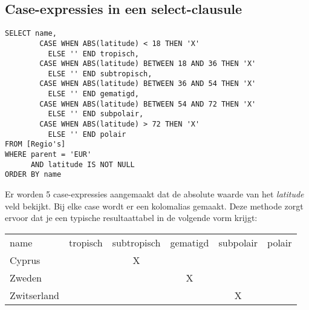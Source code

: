 \documentclass[12pt]{report}
\begin{document}
\subsection{Case-expressies in een select-clausule}

\begin{verbatim}
SELECT name,
        CASE WHEN ABS(latitude) < 18 THEN 'X' 
          ELSE '' END tropisch,
        CASE WHEN ABS(latitude) BETWEEN 18 AND 36 THEN 'X'
          ELSE '' END subtropisch,
        CASE WHEN ABS(latitude) BETWEEN 36 AND 54 THEN 'X'
          ELSE '' END gematigd,
        CASE WHEN ABS(latitude) BETWEEN 54 AND 72 THEN 'X'
          ELSE '' END subpolair,
        CASE WHEN ABS(latitude) > 72 THEN 'X'
          ELSE '' END polair
FROM [Regio's]
WHERE parent = 'EUR'
      AND latitude IS NOT NULL
ORDER BY name 
\end{verbatim}
Er worden 5 case-expressies aangemaakt dat de absolute waarde van het \textit{latitude} veld bekijkt. Bij elke case wordt er een 
kolomalias gemaakt. Deze methode zorgt ervoor dat je een typische resultaattabel in de volgende vorm krijgt:
\newline
\begin{tabular}{l c c c c c}
 name & tropisch & subtropisch & gematigd & subpolair & polair \\
 Cyprus & & X & & & \\
 Zweden & & & X & & \\
 Zwitserland & & & & X & \\
\end{tabular}
\end{document}
